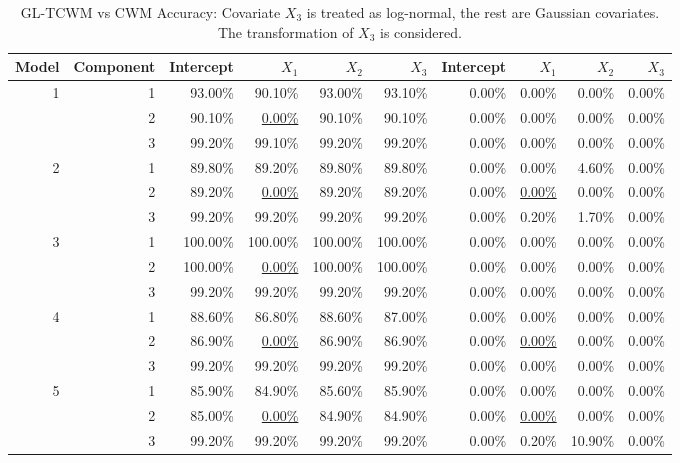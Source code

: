 \documentclass[11pt,letterpaper]{article}
\numberwithin{equation}{section}
\numberwithin{equation}{section}
\numberwithin{equation}{section}
\begin{document}
\begin{center}
\begin{table}[!htb]
\label{my-label}
\caption{GL-TCWM vs CWM Accuracy: Covariate $X_3$ is treated as log-normal, the rest are Gaussian covariates. The transformation of $X_3$ is considered.}
\begin{adjustwidth}{-1cm}{}
\begin{tabular}{|rrrrrr|rrrr|}
\hline\hline
Model & Component & Intercept & $X_1$ &$X_2$ & $X_3$& Intercept & $X_1$ &$X_2$ & $X_3$  \\
\hline
1     & 1         & 93.00\%   & 90.10\%  & 93.00\%  & 93.10\% & 0.00\% & 0.00\% & 0.00\% & 0.00\%   \\
      & 2         & 90.10\%   & \underline{0.00\%}   & 90.10\%  & 90.10\% & 0.00\% & 0.00\% & 0.00\% & 0.00\%  \\
      & 3         & 99.20\%   & 99.10\%  & 99.20\%  & 99.20\% & 0.00\% & 0.00\% & 0.00\% & 0.00\%  \\ 
2     & 1         & 89.80\%   & 89.20\%  & 89.80\%  & 89.80\% & 0.00\% & 0.00\% & 4.60\% & 0.00\%  \\
      & 2         & 89.20\%   &\underline{0.00\%}   & 89.20\%  & 89.20\% & 0.00\% & \underline{0.00\%} & 0.00\% & 0.00\%   \\
      & 3         & 99.20\%   & 99.20\%  & 99.20\%  & 99.20\% & 0.00\% & 0.20\% & 1.70\% & 0.00\%  \\ 
3     & 1         & 100.00\%  & 100.00\% & 100.00\% & 100.00\%  & 0.00\% & 0.00\% & 0.00\% & 0.00\% \\
      & 2         & 100.00\%  & \underline{0.00\%}   & 100.00\% & 100.00\% & 0.00\% & 0.00\% & 0.00\% & 0.00\% \\
      & 3         & 99.20\%   & 99.20\%  & 99.20\%  & 99.20\%  & 0.00\% & 0.00\% & 0.00\% & 0.00\%\\ 
      4 & 1 & 88.60\% & 86.80\% & 88.60\% & 87.00\%  & 0.00\% & 0.00\% & 0.00\%  & 0.00\%  \\
  & 2 & 86.90\% &\underline{ 0.00\%}  & 86.90\% & 86.90\% & 0.00\% & \underline{0.00\%} & 0.00\%  & 0.00\%  \\
  & 3 & 99.20\% & 99.20\% & 99.20\% & 99.20\% & 0.00\% & 0.00\% & 0.00\%  & 0.00\% \\ 
5 & 1 & 85.90\% & 84.90\% & 85.60\% & 85.90\% & 0.00\% & 0.00\% & 0.00\%  & 0.00\% \\
  & 2 & 85.00\% &\underline{ 0.00\%}  & 84.90\% & 84.90\% & 0.00\% & \underline{0.00\%} & 0.00\%  & 0.00\%  \\
  & 3 & 99.20\% & 99.20\% & 99.20\% & 99.20\% & 0.00\% & 0.20\% & 10.90\% & 0.00\% \\
      \hline\hline
\end{tabular}
\end{adjustwidth}
\end{table}
\end{center}
\end{document}
